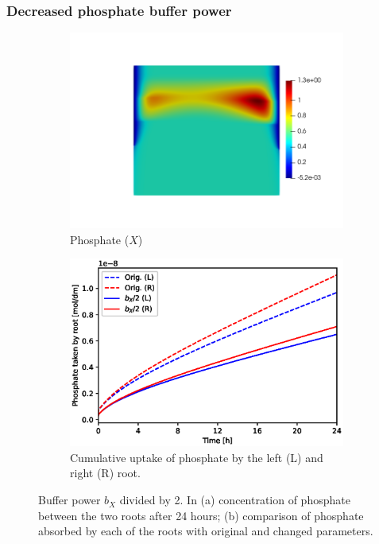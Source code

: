 \documentclass[11pt]{article}
\numberwithin{equation}{section}
\begin{document}
\FloatBarrier
\subsubsection{Decreased phosphate buffer power}
\begin{figure}[!htb]
\centering
\begin{subfigure}[t]{0.45\textwidth}
    \includegraphics[trim= 100 100 60 100,width=\textwidth]{Figures/X_bXdivby2.png}
    \caption{Phosphate ($X$)}
\end{subfigure}
\qquad
\begin{subfigure}[t]{0.45\textwidth}
    \includegraphics[width=\textwidth]{Figures/bxdivby2.eps}
    \caption{Cumulative uptake of phosphate by the left (L) and right (R) root.}
\end{subfigure}

\caption{Buffer power $b_X$ divided by 2. In (a) concentration of phosphate between the two roots after 24 hours; (b) comparison of phosphate absorbed by each of the roots with original and changed parameters.}
\end{figure}
\end{document}
